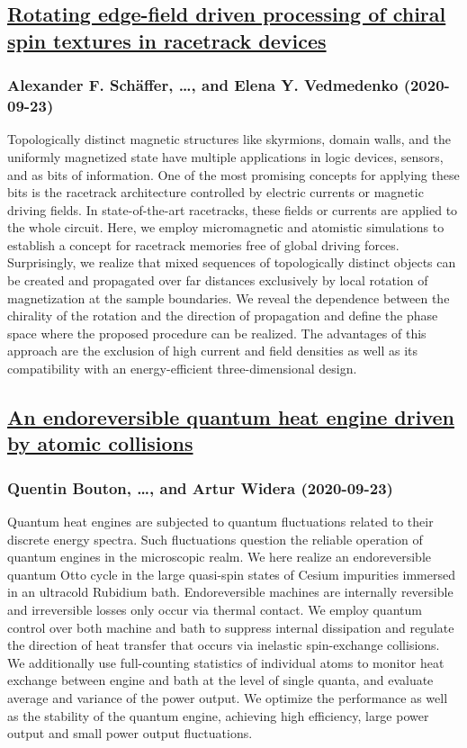 {\subsection*{\href{http://arxiv.org/abs/2009.10949v1}{Rotating edge-field driven processing of chiral spin textures in  racetrack devices}}
\subsubsection*{Alexander F. Schäffer, \dots, and Elena Y. Vedmedenko (2020-09-23)}
Topologically distinct magnetic structures like skyrmions, domain walls, and
the uniformly magnetized state have multiple applications in logic devices,
sensors, and as bits of information. One of the most promising concepts for
applying these bits is the racetrack architecture controlled by electric
currents or magnetic driving fields. In state-of-the-art racetracks, these
fields or currents are applied to the whole circuit. Here, we employ
micromagnetic and atomistic simulations to establish a concept for racetrack
memories free of global driving forces. Surprisingly, we realize that mixed
sequences of topologically distinct objects can be created and propagated over
far distances exclusively by local rotation of magnetization at the sample
boundaries. We reveal the dependence between the chirality of the rotation and
the direction of propagation and define the phase space where the proposed
procedure can be realized. The advantages of this approach are the exclusion of
high current and field densities as well as its compatibility with an
energy-efficient three-dimensional design.

\subsection*{\href{http://arxiv.org/abs/2009.10946v1}{An endoreversible quantum heat engine driven by atomic collisions}}
\subsubsection*{Quentin Bouton, \dots, and Artur Widera (2020-09-23)}
Quantum heat engines are subjected to quantum fluctuations related to their
discrete energy spectra. Such fluctuations question the reliable operation of
quantum engines in the microscopic realm. We here realize an endoreversible
quantum Otto cycle in the large quasi-spin states of Cesium impurities immersed
in an ultracold Rubidium bath. Endoreversible machines are internally
reversible and irreversible losses only occur via thermal contact. We employ
quantum control over both machine and bath to suppress internal dissipation and
regulate the direction of heat transfer that occurs via inelastic spin-exchange
collisions. We additionally use full-counting statistics of individual atoms to
monitor heat exchange between engine and bath at the level of single quanta,
and evaluate average and variance of the power output. We optimize the
performance as well as the stability of the quantum engine, achieving high
efficiency, large power output and small power output fluctuations.

}
